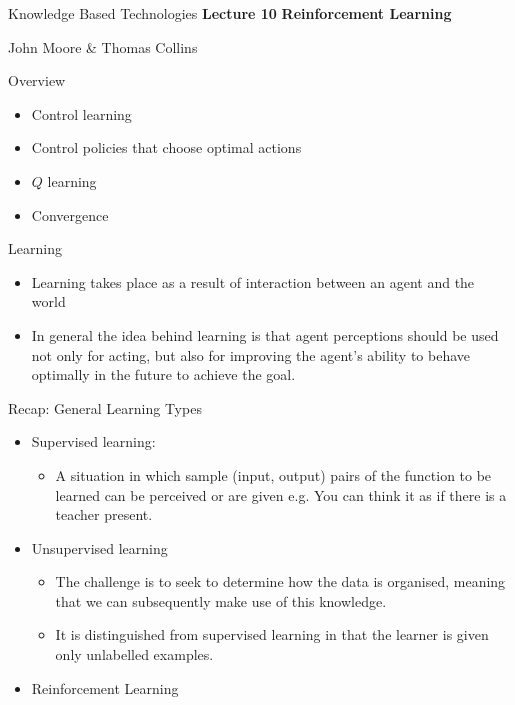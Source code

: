 \documentclass[%
pdf,
colorBG,
slideColor,
tcrico,
]{prosper}
\begin{document}
\begin{slide}{Knowledge Based Technologies}
	\textbf{Lecture 10} 
	\newline
	\textbf{Reinforcement Learning}

	\small
	John Moore \& Thomas Collins
\end{slide}

\begin{slide}{Overview} 

\begin{itemize}
\item Control learning
\item Control policies that choose optimal actions
\item $Q$ learning
\item Convergence
\end{itemize}
\end{slide}

\begin{slide}{Learning} 
\begin{itemize}
\item Learning takes place as a result of interaction between an agent and the world
\item In general the idea behind learning is that agent perceptions should be used not only for acting, but also for improving the agent's ability to behave optimally in the future to achieve the goal.
\end{itemize}
\end{slide}



\begin{slide}{Recap: General Learning Types} 
\begin{itemize}
\item Supervised learning:
  \begin{itemize}
   \item A situation in which sample (input, output) pairs of the function to be learned can be perceived or are given e.g. You can think it as if there is a teacher present.
  \end{itemize}
\item Unsupervised learning
  \begin{itemize}
   \item The challenge is to seek to determine how the data is organised, meaning that we can subsequently make use of this knowledge. 
  \item It is distinguished from supervised learning in that the learner is given only unlabelled examples.
  \end{itemize}
\item Reinforcement Learning
\end{itemize}
\end{slide}
\end{document}
